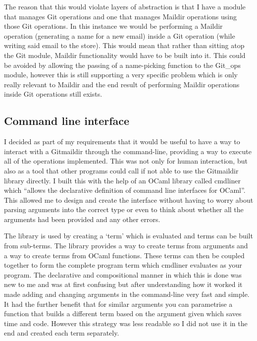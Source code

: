 The reason that this would violate layers of abstraction is that I have a module that manages Git operations and one that manages Maildir operations using those Git operations. In this instance we would be performing a Maildir operation (generating a name for a new email) inside a Git operation (while writing said email to the store). This would mean that rather than sitting atop the Git module, Maildir functionality would have to be built into it. This could be avoided by allowing the passing of a name-picking function to the Git\_ops module, however this is still supporting a very specific problem which is only really relevant to Maildir and the end result of performing Maildir operations inside Git operations still exists.

\subsection{Command line interface}

I decided as part of my requirements that it would be useful to have a way to interact with a Gitmaildir through the command-line, providing a way to execute all of the operations implemented. This was not only for human interaction, but also as a tool that other programs could call if not able to use the Gitmaildir library directly. I built this with the help of an OCaml library called cmdliner which ``allows the declarative definition of command line interfaces for OCaml''\cite{code_cmdliner}. This allowed me to design and create the interface without having to worry about parsing arguments into the correct type or even to think about whether all the arguments had been provided and any other errors.

The library is used by creating a `term' which is evaluated and terms can be built from sub-terms. The library provides a way to create terms from arguments and a way to create terms from OCaml functions. These terms can then be coupled together to form the complete program term which cmdliner evaluates as your program. The declarative and compositional manner in which this is done was new to me and was at first confusing but after understanding how it worked it made adding and changing arguments in the command-line very fast and simple. It had the further benefit that for similar arguments you can parametrise a function that builds a different term based on the argument given which saves time and code. However this strategy was less readable so I did not use it in the end and created each term separately.

